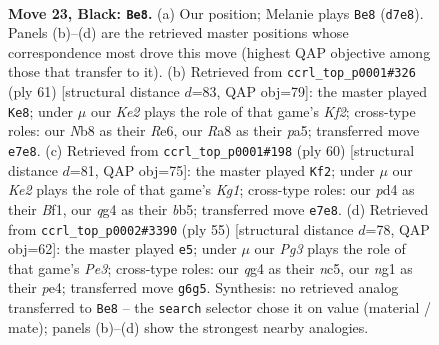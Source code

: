 \documentclass[11pt]{article}
\begin{document}
\clearpage

\begin{figure}[p]\centering
\begin{subfigure}{0.46\textwidth}\centering
\resizebox{\linewidth}{!}{%
\newchessgame
\chessboard[
  setfen={rn6/pp1bk3/1p2p1p1/1P1pP3/1P1P2Q1/2N5/8/4KBN1 b - - 0 23},
  showmover=false,
  pgfstyle=straightmove, color=movearrow, markmove={d7-e8}
]}
\caption{}
\end{subfigure}\hfill
\begin{subfigure}{0.46\textwidth}\centering
\resizebox{\linewidth}{!}{%
\newchessgame
\chessboard[
  setfen={8/5k2/p1p1rbp1/P2npp1p/2N4P/2P2PP1/1PK2B2/4R3 b - - 4 31},
  showmover=false,
  pgfstyle=straightmove, color=movearrow, markmove={f7-e8}
]}
\caption{}
\end{subfigure}
\\[4pt]
\begin{subfigure}{0.46\textwidth}\centering
\resizebox{\linewidth}{!}{%
\newchessgame
\chessboard[
  setfen={4r3/5k2/1pnp4/pb1p2pn/3P4/1PB2P2/P3P3/3NRBK1 w - - 0 31},
  showmover=false,
  pgfstyle=straightmove, color=movearrow, markmove={g1-f2}
]}
\caption{}
\end{subfigure}\hfill
\begin{subfigure}{0.46\textwidth}\centering
\resizebox{\linewidth}{!}{%
\newchessgame
\chessboard[
  setfen={2b5/4k1p1/pn2pp1p/1pN5/1P2PP2/P5P1/4BKP1/8 b - - 4 28},
  showmover=false,
  pgfstyle=straightmove, color=movearrow, markmove={e6-e5}
]}
\caption{}
\end{subfigure}
\caption{\textbf{Move 23, Black: \texttt{Be8}.} (a) Our position; Melanie plays \texttt{Be8} (\texttt{d7e8}). Panels (b)--(d) are the retrieved master positions whose correspondence most drove this move (highest QAP objective among those that transfer to it). (b) Retrieved from \texttt{ccrl\_top\_p0001\#326} (ply 61) [structural distance $d$=83, QAP obj=79]: the master played \texttt{Ke8}; under $\mu$ our \emph{Ke2} plays the role of that game's \emph{Kf2}; cross-type roles: our \emph{N}b8 as their \emph{R}e6, our \emph{R}a8 as their \emph{p}a5; transferred move \texttt{e7e8}. (c) Retrieved from \texttt{ccrl\_top\_p0001\#198} (ply 60) [structural distance $d$=81, QAP obj=75]: the master played \texttt{Kf2}; under $\mu$ our \emph{Ke2} plays the role of that game's \emph{Kg1}; cross-type roles: our \emph{p}d4 as their \emph{B}f1, our \emph{q}g4 as their \emph{b}b5; transferred move \texttt{e7e8}. (d) Retrieved from \texttt{ccrl\_top\_p0002\#3390} (ply 55) [structural distance $d$=78, QAP obj=62]: the master played \texttt{e5}; under $\mu$ our \emph{Pg3} plays the role of that game's \emph{Pe3}; cross-type roles: our \emph{q}g4 as their \emph{n}c5, our \emph{n}g1 as their \emph{p}e4; transferred move \texttt{g6g5}. Synthesis: no retrieved analog transferred to \texttt{Be8} -- the \texttt{search} selector chose it on value (material / mate); panels (b)--(d) show the strongest nearby analogies.}
\label{fig:thought-m45}
\end{figure}
\end{document}
